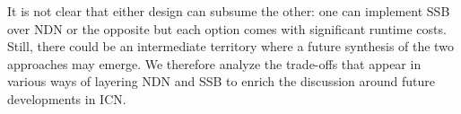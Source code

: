 \documentclass[9pt,sigconf]{acmart}
\begin{document}
%
%

It is not clear that either design can subsume the other: one can implement SSB over NDN or the opposite but each option comes with significant runtime costs. Still, there could be an intermediate territory where a future synthesis of the two approaches may emerge. We therefore analyze the trade-offs that appear in various ways of layering NDN and SSB to enrich the discussion around future developments in ICN.




%
\end{document}
